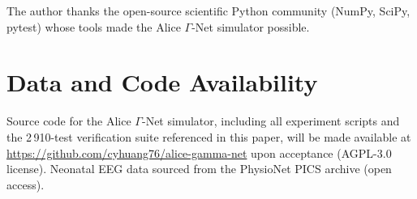 ﻿\documentclass[aps,pre,twocolumn,superscriptaddress,floatfix]{revtex4-2}
\begin{document}
\begin{acknowledgments}
The author thanks the open-source scientific Python community
(NumPy, SciPy, pytest) whose tools made the Alice $\Gamma$-Net
simulator possible.
\end{acknowledgments}

\section*{Data and Code Availability}
Source code for the Alice $\Gamma$-Net simulator, including all
experiment scripts and the 2\,910-test verification suite
referenced in this paper, will be made available at
\url{https://github.com/cyhuang76/alice-gamma-net}
upon acceptance (AGPL-3.0 license).
Neonatal EEG data sourced from the PhysioNet PICS archive
(open access).
\end{document}
